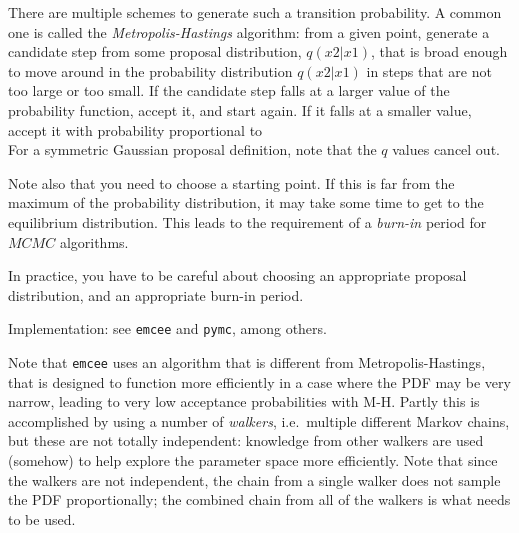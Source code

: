 \documentclass[12pt]{article}
\begin{document}
There are multiple schemes to generate such a transition probability.
A common one is called the \emph{Metropolis-Hastings} algorithm:
from a given point, generate a candidate step from some proposal
distribution, $q(x2|x1)$, that is broad enough to move around in the
probability distribution $q(x2|x1)$ in steps that are not too large
or too small. If the candidate step falls at a larger value of the
probability function, accept it, and start again. If it falls at a
smaller value, accept it with probability proportional to
$$ $$
For a symmetric Gaussian proposal definition, note that the $q$ values
cancel out.

Note also that you need to choose a starting point. If this is far from
the maximum of the probability distribution, it may take some time to
get to the equilibrium distribution. This leads to the requirement of a
\emph{burn-in} period for $MCMC$ algorithms.

In practice, you have to be careful about choosing an appropriate
proposal distribution, and an appropriate burn-in period.

Implementation: see \texttt{emcee} and \texttt{pymc}, among others.

Note that \texttt{emcee} uses an algorithm that is different from
Metropolis-Hastings, that is designed to function more efficiently
in a case where the PDF may be very narrow, leading to very low
acceptance probabilities with M-H. Partly this is accomplished by
using a number of \emph{walkers}, i.e.\ multiple different Markov
chains, but these are not totally independent: knowledge from other
walkers are used (somehow) to help explore the parameter space more
efficiently. Note that since the walkers are not independent, the
chain from a single walker does not sample the PDF proportionally;
the combined chain from all of the walkers is what needs to be used.
\end{document}
